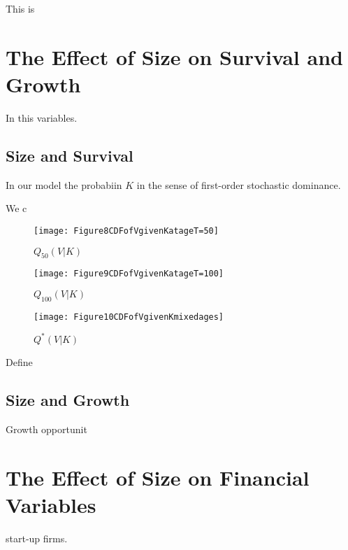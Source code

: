 \documentclass[12pt]{article}
\begin{document}
\bigskip

\noindent This is 

\section{The Effect of Size on Survival and Growth}

\label{sizereal}In this variables.

\subsection{Size and Survival}

In our model the probabiin $K$ in the sense of first-order stochastic
dominance.

We c
\begin{minipage}[t]{0.33\textwidth}
	\begin{figure}[H]
		\center
		\texttt{[image: Figure8CDFofVgivenKatageT=50]}
		\caption{$Q_{50} ( \left. V\right\vert	K) $}
		\label{fig:fig8}
	\end{figure}
\end{minipage}
\begin{minipage}[t]{0.33\textwidth}
	\begin{figure}[H]
		\center
		\texttt{[image: Figure9CDFofVgivenKatageT=100]}
		\caption{$Q_{100}\left( \left. V\right\vert K\right) $}
		\label{fig:fig9}
	\end{figure}
\end{minipage}
\begin{minipage}[t]{0.33\textwidth}
	\begin{figure}[H]
		\center
		\texttt{[image: Figure10CDFofVgivenKmixedages]}
		\caption{$Q^{\ast}\left( \left. V\right\vert K\right) $}
		\label{fig:fig10}
	\end{figure}
\end{minipage}

\bigskip

\noindent Define 
\subsection{Size and Growth}

Growth opportunit
\section{The Effect of Size on Financial Variables}

start-up firms.
\end{document}
